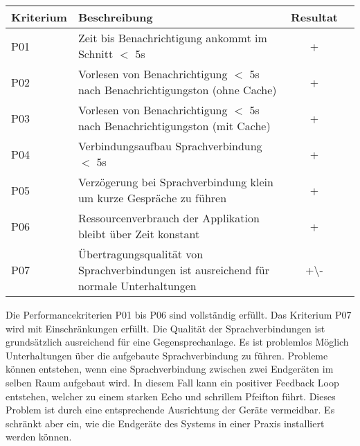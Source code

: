 \begin{table}[h]
    \centering
    \begin{tabular}{|l|p{11cm}|c|c|}
        \hline
        \textbf{Kriterium} & \textbf{Beschreibung} & \textbf{Resultat} \\
        \hline
        P01         & Zeit bis Benachrichtigung ankommt im Schnitt $<$ 5s & +\\
        \hline
        P02         & Vorlesen von Benachrichtigung $<$ 5s nach Benachrichtigungston (ohne Cache) & +\\
        \hline
        P03         & Vorlesen von Benachrichtigung $<$ 5s nach Benachrichtigungston (mit Cache) & +\\
        \hline
        P04         & Verbindungsaufbau Sprachverbindung $<$ 5s  & +\\
        \hline
        P05         & Verzögerung bei Sprachverbindung klein um kurze Gespräche zu führen & +\\
        \hline
        P06         & Ressourcenverbrauch der Applikation bleibt über Zeit konstant & +\\
        \hline
        P07         & Übertragungsqualität von Sprachverbindungen ist ausreichend für normale Unterhaltungen & +\textbackslash- \\
        \hline
    \end{tabular}\label{tab:testplan_performance}
\end{table}

Die Performancekriterien P01 bis P06 sind vollständig erfüllt.
Das Kriterium P07 wird mit Einschränkungen erfüllt.
Die Qualität der Sprachverbindungen ist grundsätzlich ausreichend für eine Gegensprechanlage.
Es ist problemlos Möglich Unterhaltungen über die aufgebaute Sprachverbindung zu führen.
Probleme können entstehen, wenn eine Sprachverbindung zwischen zwei Endgeräten im selben Raum aufgebaut wird.
In diesem Fall kann ein positiver Feedback Loop entstehen, welcher zu einem starken Echo und schrillem Pfeifton führt.
Dieses Problem ist durch eine entsprechende Ausrichtung der Geräte vermeidbar.
Es schränkt aber ein, wie die Endgeräte des Systems in einer Praxis installiert werden können.

\clearpage
